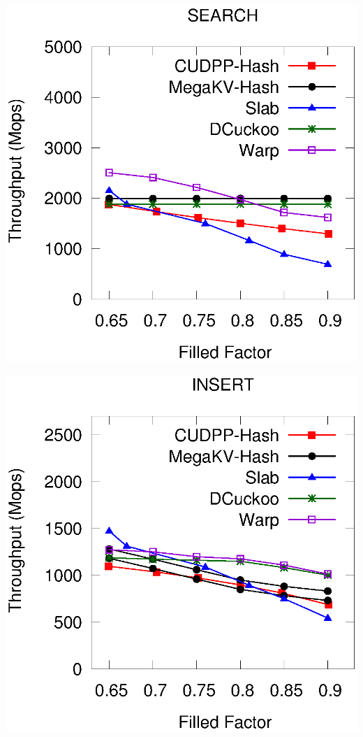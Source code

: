 \begin{minipage}{\textwidth}
\begin{minipage}[b]{0.49\textwidth}
\begin{minipage}{0.49\textwidth}
			\includegraphics[width=\textwidth]{../pic/static-load_factor/twitter/search.eps}
			\centerline{}
		\end{minipage}
	\end{minipage}
	\hfill
	\begin{minipage}[b]{0.49\textwidth}\centering
		\begin{minipage}{0.49\textwidth}\centering
			\includegraphics[width=\textwidth]{../pic/static-load_factor/tpch/insert.eps}

\end{minipage}
\end{minipage}
\end{minipage}
